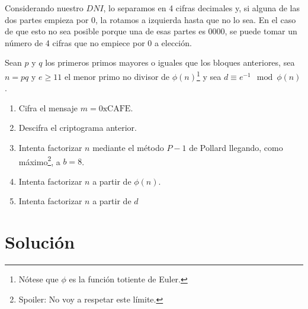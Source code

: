 	Considerando nuestro $DNI$, lo separamos en 4 cifras decimales y, si alguna de las dos partes empieza por 0,
	la rotamos a izquierda hasta que no lo sea. En el caso de que esto no sea posible porque una de esas partes
	es 0000, se puede tomar un número de 4 cifras que no empiece por 0 a elección.
	
	Sean $p$ y $q$ los primeros primos mayores o iguales que los bloques anteriores, sea $n = pq$ y $e \geq 11$
	el menor primo no divisor de $\phi(n)$\footnote{Nótese que $\phi$ es la función totiente de Euler.} y sea
	$d \equiv e^{-1} \mod \phi(n)$.
	\begin{enumerate}
		\item Cifra el mensaje $m = \mathrm{0xCAFE}$.
		\item Descifra el criptograma anterior.
		\item Intenta factorizar $n$ mediante el método $P-1$ de Pollard llegando, como máximo\footnote{Spoiler:
		No voy a respetar este límite.}, a $b = 8$.
		\item Intenta factorizar $n$ a partir de $\phi(n)$.
		\item Intenta factorizar $n$ a partir de $d$
	\end{enumerate}
\section*{Solución}